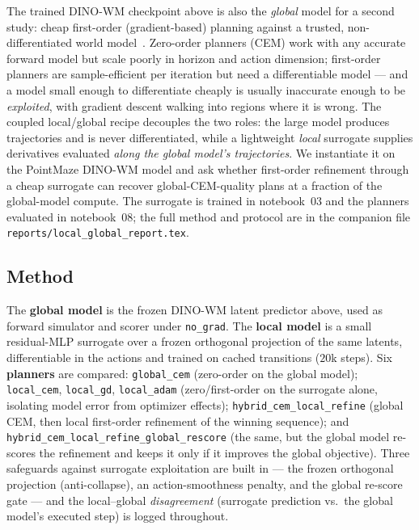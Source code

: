 \documentclass[11pt,a4paper]{article}
\begin{document}
The trained DINO-WM checkpoint above is also the \emph{global} model for a
second study: cheap first-order (gradient-based) planning against a trusted,
non-differentiated world model~\cite{fog2026}. Zero-order planners (CEM) work
with any accurate forward model but scale poorly in horizon and action
dimension; first-order planners are sample-efficient per iteration but need a
differentiable model --- and a model small enough to differentiate cheaply is
usually inaccurate enough to be \emph{exploited}, with gradient descent walking
into regions where it is wrong. The coupled local/global recipe decouples the
two roles: the large model produces trajectories and is never differentiated,
while a lightweight \emph{local} surrogate supplies derivatives evaluated
\emph{along the global model's trajectories}. We instantiate it on the
PointMaze DINO-WM model and ask whether first-order refinement through a cheap
surrogate can recover global-CEM-quality plans at a fraction of the
global-model compute. The surrogate is trained in notebook~03 and the planners
evaluated in notebook~08; the full method and protocol are in the companion
file \texttt{reports/local\_global\_report.tex}.

\subsection{Method}
The \textbf{global model} is the frozen DINO-WM latent predictor above, used as
forward simulator and scorer under \texttt{no\_grad}. The \textbf{local model}
is a small residual-MLP surrogate over a frozen orthogonal projection of the
same latents, differentiable in the actions and trained on cached transitions
($20$k steps). Six \textbf{planners} are compared: \texttt{global\_cem}
(zero-order on the global model); \texttt{local\_cem}, \texttt{local\_gd},
\texttt{local\_adam} (zero/first-order on the surrogate alone, isolating model
error from optimizer effects); \texttt{hybrid\_cem\_local\_refine} (global CEM,
then local first-order refinement of the winning sequence); and
\texttt{hybrid\_cem\_local\_refine\_global\_rescore} (the same, but the global
model re-scores the refinement and keeps it only if it improves the global
objective). Three safeguards against surrogate exploitation are built in --- the
frozen orthogonal projection (anti-collapse), an action-smoothness penalty, and
the global re-score gate --- and the local--global \emph{disagreement} (surrogate
prediction vs.\ the global model's executed step) is logged throughout.
\end{document}
